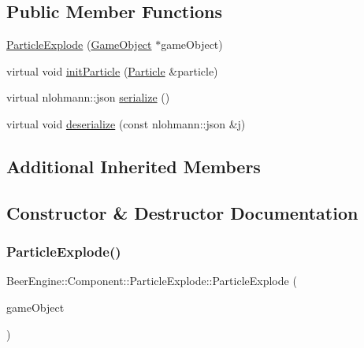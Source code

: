 \subsection*{Public Member Functions}
\begin{DoxyCompactItemize}
\item 
\mbox{\hyperlink{class_beer_engine_1_1_component_1_1_particle_explode_a4e2e2cda3419ea1cab71a61c6e13abad}{Particle\+Explode}} (\mbox{\hyperlink{class_beer_engine_1_1_game_object}{Game\+Object}} $\ast$game\+Object)
\item 
virtual void \mbox{\hyperlink{class_beer_engine_1_1_component_1_1_particle_explode_abe727afab3c6a77d2b163e2c37a0f37b}{init\+Particle}} (\mbox{\hyperlink{struct_beer_engine_1_1_component_1_1_particle}{Particle}} \&particle)
\item 
virtual nlohmann\+::json \mbox{\hyperlink{class_beer_engine_1_1_component_1_1_particle_explode_a194d098568efe69f8e8b62eec5863ae6}{serialize}} ()
\item 
virtual void \mbox{\hyperlink{class_beer_engine_1_1_component_1_1_particle_explode_ad79e74129dd1cd7f20e0575a9ffdffc3}{deserialize}} (const nlohmann\+::json \&j)
\end{DoxyCompactItemize}
\subsection*{Additional Inherited Members}


\subsection{Constructor \& Destructor Documentation}
\mbox{\label{class_beer_engine_1_1_component_1_1_particle_explode_a4e2e2cda3419ea1cab71a61c6e13abad}} 
\subsubsection{\texorpdfstring{Particle\+Explode()}{ParticleExplode()}}
{\footnotesize\ttfamily Beer\+Engine\+::\+Component\+::\+Particle\+Explode\+::\+Particle\+Explode (\begin{DoxyParamCaption}\item[{\mbox{\hyperlink{class_beer_engine_1_1_game_object}{Game\+Object}} $\ast$}]{game\+Object }\end{DoxyParamCaption})}



